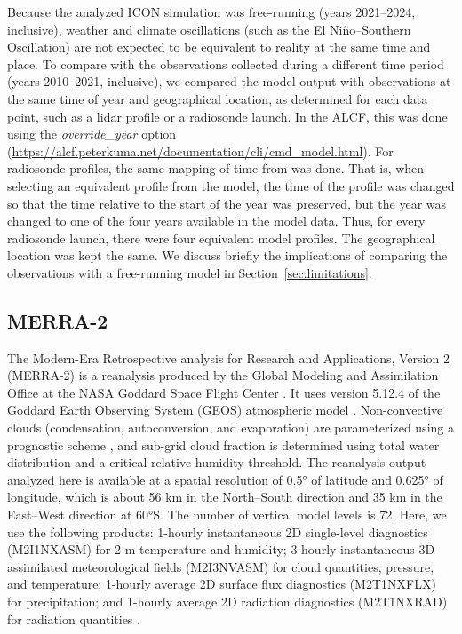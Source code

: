 \documentclass[draft]{agujournal2019}
\begin{document}
Because the analyzed ICON simulation was free-running (years 2021--2024, inclusive), weather and climate oscillations (such as the El Niño--Southern Oscillation) are not expected to be equivalent to reality at the same time and place. To compare with the observations collected during a different time period (years 2010--2021, inclusive), we compared the model output with observations at the same time of year and geographical location, as determined for each data point, such as a lidar profile or a radiosonde launch. In the ALCF, this was done using the \emph{override\_year} option (\url{https://alcf.peterkuma.net/documentation/cli/cmd_model.html}). For radiosonde profiles, the same mapping of time from was done. That is, when selecting an equivalent profile from the model, the time of the profile was changed so that the time relative to the start of the year was preserved, but the year was changed to one of the four years available in the model data. Thus, for every radiosonde launch, there were four equivalent model profiles. The geographical location was kept the same. We discuss briefly the implications of comparing the observations with a free-running model in Section~\ref{sec:limitations}.

\subsection{MERRA-2}

The Modern-Era Retrospective analysis for Research and Applications, Version 2 (MERRA-2) is a reanalysis produced by the Global Modeling and Assimilation Office at the NASA Goddard Space Flight Center \cite{gelaro2017}. It uses version 5.12.4 of the Goddard Earth Observing System (GEOS) atmospheric model \cite{rienecker2008,molod2015}. Non-convective clouds (condensation, autoconversion, and evaporation) are parameterized using a prognostic scheme \cite{bacmeister2006}, and sub-grid cloud fraction is determined using total water distribution and a critical relative humidity threshold. The reanalysis output analyzed here is available at a spatial resolution of 0.5° of latitude and 0.625° of longitude, which is about 56 km in the North--South direction and 35 km in the East--West direction at 60°S. The number of vertical model levels is 72. Here, we use the following products: 1-hourly instantaneous 2D single-level diagnostics (M2I1NXASM) for 2-m temperature and humidity; 3-hourly instantaneous 3D assimilated meteorological fields (M2I3NVASM) for cloud quantities, pressure, and temperature; 1-hourly average 2D surface flux diagnostics (M2T1NXFLX) for precipitation; and 1-hourly average 2D radiation diagnostics (M2T1NXRAD) for radiation quantities \cite{merra2}.
\end{document}
